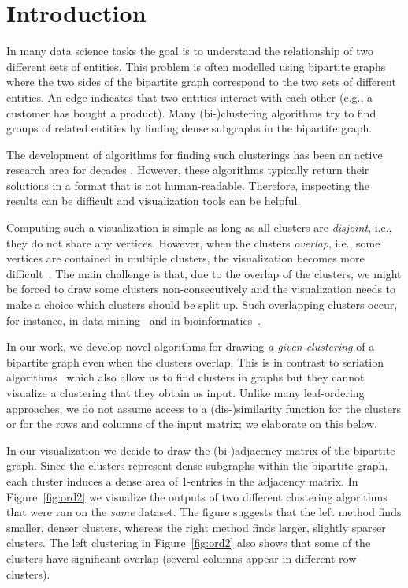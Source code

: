 \documentclass[twoside,leqno,twocolumn]{article}
\theoremstyle{definition}
\begin{document}
\section{Introduction}
\noindent In many data science tasks the goal is to understand the relationship of two different sets of entities. This problem is often modelled using bipartite graphs where the two sides of the bipartite graph correspond to the two sets of different entities. An edge indicates that two entities interact with each other (e.g., a customer has bought a product). Many (bi-)clustering algorithms try to find groups of related entities by finding dense subgraphs in the bipartite graph.

The development of algorithms for finding such clusterings has been an active research area for decades \cite{hartigan1972direct,asso,NEURIPS2018_ab731488}. However, these algorithms typically return their solutions in a format that is not human-readable. Therefore, inspecting the results can be difficult and visualization tools can be helpful.

Computing such a visualization is simple as long as all clusters are \emph{disjoint}, i.e., they do not share any vertices. However, when the clusters \emph{overlap}, i.e., some vertices are contained in multiple clusters, the visualization becomes more difficult~\cite{Vehlow2017VisualizingGS}. The main challenge is that, due to the overlap of the clusters, we might be forced to draw some clusters non-consecutively and the visualization needs to make a choice which clusters should be split up. Such overlapping clusters occur, for instance, in data mining~\cite{asso,BMFrecent} and in bioinformatics~\cite{1324618}.

In our work, we develop novel algorithms for drawing \emph{a given clustering} of a bipartite graph even when the clusters overlap. This is in contrast to seriation algorithms~\cite{MatrixReorderingSTAR,Xu2016InteractiveVC} which also allow us to find clusters in graphs but they cannot visualize a clustering that they obtain as input. Unlike many leaf-ordering approaches, we do not assume access to a (dis-)similarity function for the clusters or for the rows and columns of the input matrix; we elaborate on this below.

In our visualization we decide to draw the (bi-)adjacency matrix of the bipartite graph. Since the clusters represent dense subgraphs within the bipartite graph, each cluster induces a dense area of 1-entries in the adjacency matrix.
In Figure~\ref{fig:ord2} we visualize the outputs of two different clustering algorithms that were run on the \emph{same} dataset. The figure suggests that the left method finds smaller, denser clusters, whereas the right method finds larger, slightly sparser clusters. The left clustering in Figure~\ref{fig:ord2} also shows that some of the clusters have significant overlap (several columns appear in different row-clusters).
\end{document}
